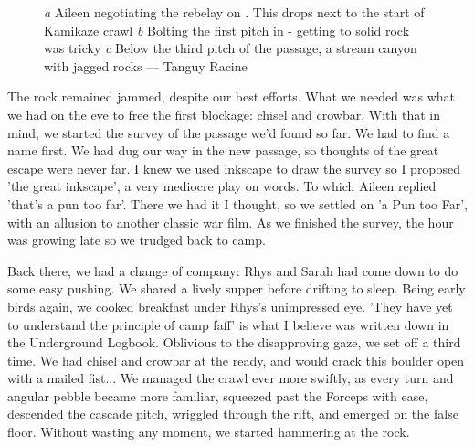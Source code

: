 \begin{figure}[t!]
\checkoddpage \ifoddpage \forcerectofloat \else \forceversofloat \fi
\centering
    \begin{subfigure}[t]{0.316\textwidth}
        \centering
        \caption{} \label{Bolting a Pun Too Far}
    \end{subfigure}
\hfill    
\begin{subfigure}[t]{0.674\textwidth}
    \centering
        \caption{} \label{Canyon of A Pun Too Far}
    \end{subfigure}
    \begin{subfigure}[t]{\textwidth}
\centering
{}
 \caption{}\label{milka pitch}
\end{subfigure}
    \caption{
    \emph{a} Aileen negotiating the rebelay on \protect{}. This drops next to the start of Kamikaze crawl
    \emph{b} Bolting the first pitch in \protect{} - getting to solid rock was tricky
    \emph{c} Below the third pitch of the passage, a stream canyon with jagged rocks --- Tanguy Racine }
\end{figure}

The rock remained jammed, despite our best efforts. What we needed was what we had on the eve to free the first blockage: chisel and crowbar. With that in mind, we started the survey of the passage we'd found so far. We had to find a name first. We had dug our way in the new passage, so thoughts of the great escape were never far. I knew we used inkscape to draw the survey so I proposed 'the great inkscape', a very mediocre play on words. To which Aileen replied 'that's a pun too far'. There we had it I thought, so we settled on 'a Pun too Far', with an allusion to another classic war film. As we finished the survey, the hour was growing late so we trudged back to camp.

Back there, we had a change of company: Rhys and Sarah had come down to do some easy pushing. We shared a lively supper before drifting to sleep.
Being early birds again, we cooked breakfast under Rhys's unimpressed eye. 'They have yet to understand the principle of camp faff' is what I believe was written down in the Underground Logbook. Oblivious to the disapproving gaze, we set off a third time. We had chisel and crowbar at the ready, and would crack this boulder open with a mailed fist...
We managed the crawl ever more swiftly, as every turn and angular pebble became more familiar, squeezed past the Forceps with ease, descended the cascade pitch, wriggled through the rift, and emerged on the false floor. Without wasting any moment, we started hammering at the rock. 

